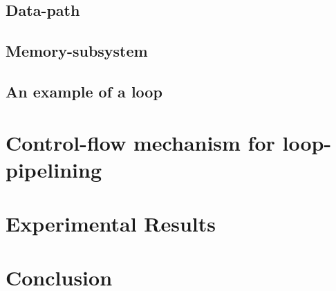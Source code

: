 \documentclass[conference]{IEEEtran}
\begin{document}

\subsection{Data-path}


\subsection{Memory-subsystem}


\subsection{An example of a loop}


\section{Control-flow mechanism for loop-pipelining}


\section{Experimental Results}


\section{Conclusion}




\end{document}
